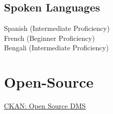 \documentclass[]{deedy-resume-openfont}
\begin{document}
\begin{minipage}[t]{0.31\textwidth}
\subsection{Spoken Languages}
Spanish (Intermediate Proficiency) \\
French (Beginner Proficiency)\\
Bengali (Intermediate Proficiency)
\sectionsep

\section{Open-Source}
\textbullet{} {\color{blue}\underline{\href{https://github.com/ckan/ckan}{\color{blue}CKAN: Open Source DMS}}}

%
%

\end{minipage} 
\hfill
\end{document}
